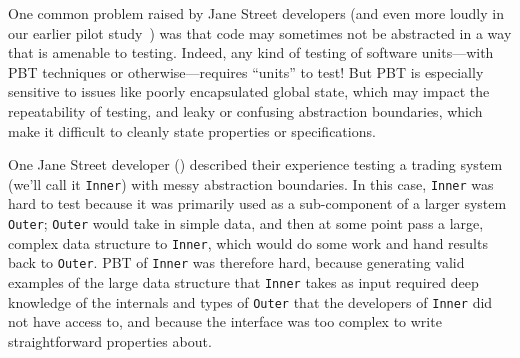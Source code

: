 %
%
One common problem raised by Jane Street developers (and even more loudly
in our earlier pilot study~\cite{ref:goldstein2022some}) was
that code may sometimes not be abstracted
in a way that is amenable to testing. Indeed, any kind of
testing of software units---with PBT techniques or otherwise---requires
``units'' to test!  But PBT is
especially sensitive to issues like poorly encapsulated global state, which may
impact the repeatability of testing, and leaky or confusing
abstraction boundaries, which make it difficult to cleanly state
properties or specifications.

One Jane Street developer () described their experience testing a
trading system (we'll call it \lstinline{Inner}) with messy abstraction
boundaries. In this case, \lstinline{Inner} was hard to test because it was
primarily used as a sub-component of a larger system \lstinline{Outer};
\lstinline{Outer} would take in simple data, and then at some point pass a
large, complex data structure to \lstinline{Inner}, which would do some work and
hand results back to \lstinline{Outer}. PBT of \lstinline{Inner} was therefore
hard, because generating valid examples of the large data structure that
\lstinline{Inner} takes as input required deep knowledge of the internals and
types of \lstinline{Outer} that the developers of \lstinline{Inner} did not have
access to, and because the interface was too complex to write straightforward
properties about.

